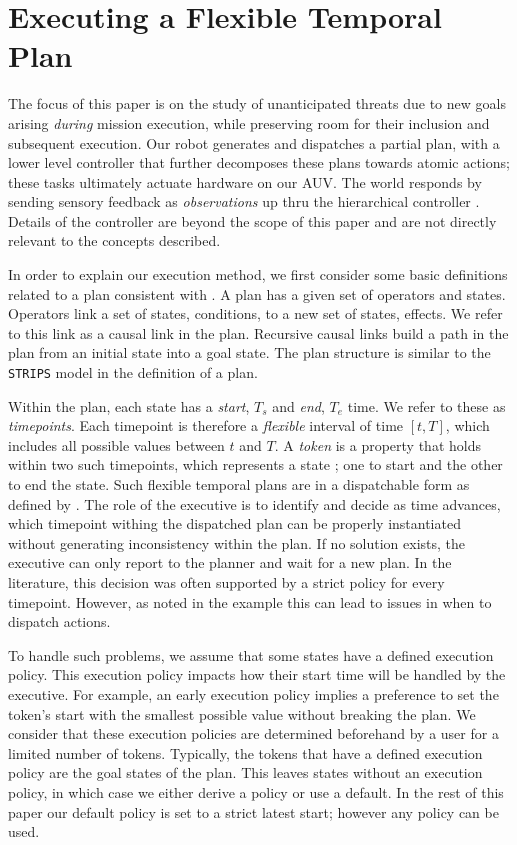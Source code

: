 \section{Executing a Flexible Temporal Plan}
\label{sec: defs}

The focus of this paper is on the study of unanticipated threats due
to new goals arising \emph{during} mission execution, while preserving
room for their inclusion and subsequent execution.  Our robot
generates and dispatches a partial plan, with a lower level controller
that further decomposes these plans towards atomic actions; these
tasks ultimately actuate hardware on our AUV. The world responds by
sending sensory feedback as \emph{observations} up thru the
hierarchical controller \cite{mcgann08a,rajan12}. Details of the
controller are beyond the scope of this paper and are not directly
relevant to the concepts described.

In order to explain our execution method, we first consider some basic
definitions related to a plan consistent with \cite{Nau:2004}. A plan
has a given set of operators and states.  Operators link a set of
states, conditions, to a new set of states, effects. We refer to this
link as a causal link in the plan. Recursive causal links build a path
in the plan from an initial state into a goal state. The plan
structure is similar to the \texttt{STRIPS} model in the definition of
a plan.

Within the plan, each state has a {\em start}, $T_s$ and {\em end},
$T_e$ time. We refer to these as {\em timepoints}. Each timepoint is
therefore a \emph{flexible} interval of time $[t, T]$, which includes
all possible values between $t$ and $T$.  A \emph{token} is a property
that holds within two such timepoints, which represents a state
\cite{py10}; one to start and the other to end the state.  Such
flexible temporal plans are in a dispatchable form as defined by
\cite{mus98a}.  The role of the executive is to identify and decide as
time advances, which timepoint withing the dispatched plan can be
properly instantiated without generating inconsistency within the
plan. If no solution exists, the executive can only report to the
planner and wait for a new plan. In the literature, this decision was
often supported by a strict policy for every timepoint. However, as
noted in the example this can lead to issues in when to dispatch
actions.

To handle such problems, we assume that some states have a defined
execution policy. This execution policy impacts how their start time
will be handled by the executive. For example, an early execution
policy implies a preference to set the token's start with the smallest
possible value without breaking the plan. We consider that these
execution policies are determined beforehand by a user for a limited
number of tokens. Typically, the tokens that have a defined execution
policy are the goal states of the plan. This leaves states without an
execution policy, in which case we either derive a policy or use a
default. In the rest of this paper our default policy is set to a
strict latest start; however any policy can be used.


